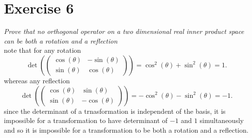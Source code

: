\documentclass{article}
\begin{document}
    \section{Exercise 6}
    \emph{
        Prove that no orthogonal operator on a two dimensional real inner product space
        can be both a rotation and a reflection
    }\\
    note that for any rotation
    \[
        \det(\begin{pmatrix} \cos(\theta) & -\sin(\theta) \\
        \sin(\theta) & \cos(\theta)
        \end{pmatrix} ) = \cos^2(\theta) + \sin^2(\theta) = 1
    .\] 
    whereas any reflection
    \[
    \det( \begin{pmatrix} 
        \cos(\theta) & \sin(\theta)\\
        \sin(\theta) & -\cos(\theta)
    \end{pmatrix} ) = -\cos^2(\theta) - \sin^2(\theta) = -1
    .\] 
    since the determinant of a trnasformation is independent of the basis, it is impossible for a transformation to have
    determinant of $-1$ and $1$ simultaneously and so it is impossible for a transformation to be both a rotation and a reflection.
\end{document}
